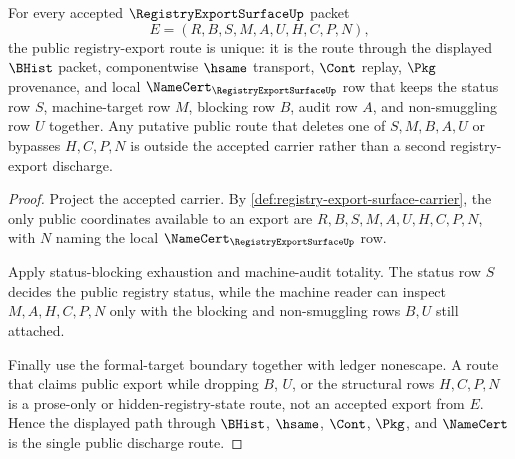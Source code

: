 \begin{theorem}
\label{thm:registry-export-surface-public-discharge}
For every accepted $\RegistryExportSurfaceUp$ packet
$$
E=(R,B,S,M,A,U,H,C,P,N),
$$
the public registry-export route is unique: it is the route through the displayed $\BHist$ packet, componentwise $\hsame$ transport, $\Cont$ replay, $\Pkg$ provenance, and local $\NameCert_{\RegistryExportSurfaceUp}$ row that keeps the status row $S$, machine-target row $M$, blocking row $B$, audit row $A$, and non-smuggling row $U$ together. Any putative public route that deletes one of $S,M,B,A,U$ or bypasses $H,C,P,N$ is outside the accepted carrier rather than a second registry-export discharge.
\end{theorem}
\begin{proof}
Project the accepted carrier. By \autoref{def:registry-export-surface-carrier}, the only public coordinates available to an export are $R,B,S,M,A,U,H,C,P,N$, with $N$ naming the local $\NameCert_{\RegistryExportSurfaceUp}$ row.

Apply status-blocking exhaustion and machine-audit totality. The status row $S$ decides the public registry status, while the machine reader can inspect $M,A,H,C,P,N$ only with the blocking and non-smuggling rows $B,U$ still attached.

Finally use the formal-target boundary together with ledger nonescape. A route that claims public export while dropping $B$, $U$, or the structural rows $H,C,P,N$ is a prose-only or hidden-registry-state route, not an accepted export from $E$. Hence the displayed path through $\BHist$, $\hsame$, $\Cont$, $\Pkg$, and $\NameCert$ is the single public discharge route.
\end{proof}


\begin{closurestatus}{\RegistryExportSurfaceUp}
  \theoryclosure{\matureClosure}
  \formalstatus{\unformalizedV}
\end{closurestatus}
